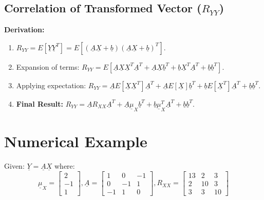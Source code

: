 \documentclass[12pt]{article}
\begin{document}
\subsection{Correlation of Transformed Vector ($R_{YY}$)}
\textbf{Derivation:}
\begin{enumerate}
    \item $R_{YY} = E[\underline{Y}\underline{Y}^T] = E[(\underline{A}\underline{X} + \underline{b})(\underline{A}\underline{X} + \underline{b})^T]$.
    \item Expansion of terms: $R_{YY} = E[\underline{A}\underline{X}\underline{X}^T\underline{A}^T + \underline{A}\underline{X}\underline{b}^T + \underline{b}\underline{X}^T\underline{A}^T + \underline{b}\underline{b}^T]$.
    \item Applying expectation: $R_{YY} = \underline{A}E[\underline{X}\underline{X}^T]\underline{A}^T + \underline{A}E[\underline{X}]\underline{b}^T + \underline{b}E[\underline{X}^T]\underline{A}^T + \underline{b}\underline{b}^T$.
    \item \textbf{Final Result:} $R_{YY} = \underline{A}R_{XX}\underline{A}^T + \underline{A}\underline{\mu}_X\underline{b}^T + \underline{b}\underline{\mu}_X^T\underline{A}^T + \underline{b}\underline{b}^T$.
\end{enumerate}

\section{Numerical Example}
Given: $\underline{Y} = \underline{A}\underline{X}$ where:
\[
\underline{\mu}_X = \begin{bmatrix} 2 \\ -1 \\ 1 \end{bmatrix}, \underline{A} = \begin{bmatrix} 1 & 0 & -1 \\ 0 & -1 & 1 \\ -1 & 1 & 0 \end{bmatrix}, R_{XX} = \begin{bmatrix} 13 & 2 & 3 \\ 2 & 10 & 3 \\ 3 & 3 & 10 \end{bmatrix}
\]
\end{document}
